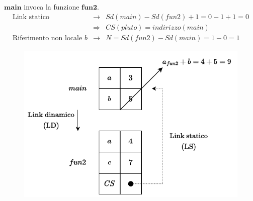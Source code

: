 \documentclass[a4paper]{article}
\begin{document}
	\noindent
	$\mathbf{main}$ invoca la funzione $\mathbf{fun2}$.
	\begin{equation*}
		\begin{array}{rcl}
			\text{Link statico} &\rightarrow& Sd(main) - Sd(fun2) + 1 = 0 - 1 + 1 = 0 \\ [.3em]
			&\Rightarrow& CS(pluto) = indirizzo(main) \\ [.3em]
			\text{Riferimento non locale }b &\rightarrow& N = Sd(fun2) - Sd(main) = 1 - 0 = 1
		\end{array}
	\end{equation*}
	\begin{figure}[!htp]
		\centering
		\includegraphics[width=\textwidth]{img/ex3-015.pdf}
	\end{figure}\newpage
	
\end{document}
